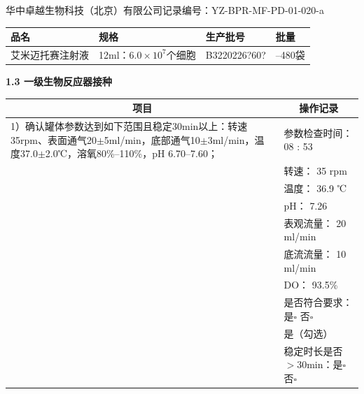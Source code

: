 \documentclass[UTF8,10pt,a4paper,fontset=fandol]{ctexart}
\newcommand{\fieldvalue}[1]{#1}
\newcommand{\handwritten}[1]{#1}
\begin{document}
\noindent
华中卓越生物科技（北京）有限公司\hfill 记录编号：YZ-BPR-MF-PD-01-020-a

\begin{tabularx}{\textwidth}{|>{\centering\arraybackslash}X|>{\centering\arraybackslash}X|>{\centering\arraybackslash}X|>{\centering\arraybackslash}X|}
\hline
品名 & 规格 & 生产批号 & 批量\\
\hline
艾米迈托赛注射液 & 12ml：$6.0\times10^7$个细胞 &
\fieldvalue{\handwritten{B3220226?60?}} &
200--480袋\\
\hline
\end{tabularx}

\medskip
\noindent\textbf{1.3 一级生物反应器接种}

\begin{tabularx}{\textwidth}{|p{}|X|}
\hline
\multicolumn{1}{|c|}{项目} & \multicolumn{1}{c|}{操作记录}\\
\hline
1）确认罐体参数达到如下范围且稳定30min以上：转速35rpm、表面通气20$\pm$5ml/min，底部通气10$\pm$3ml/min，温度37.0$\pm$2.0℃，溶氧80\%--110\%，pH 6.70--7.60； &
参数检查时间：
\fieldvalue{\handwritten{08 : 53}}\\
& 转速：
\fieldvalue{\handwritten{35}} rpm\\
& 温度：
\fieldvalue{\handwritten{36.9}} ℃\\
& pH：
\fieldvalue{\handwritten{7.26}}\\
& 表观流量：
\fieldvalue{\handwritten{20}} ml/min\\
& 底流流量：
\fieldvalue{\handwritten{10}} ml/min\\
& DO：
\fieldvalue{\handwritten{93.5}}\%\\
& 是否符合要求：是$\square$ 否$\square$\\[-2pt]
& 
\fieldvalue{\handwritten{是（勾选）}}\\
& 稳定时长是否$>$30min：是$\square$ 否$\square$\\[-2pt]

\end{tabularx}
\end{document}
